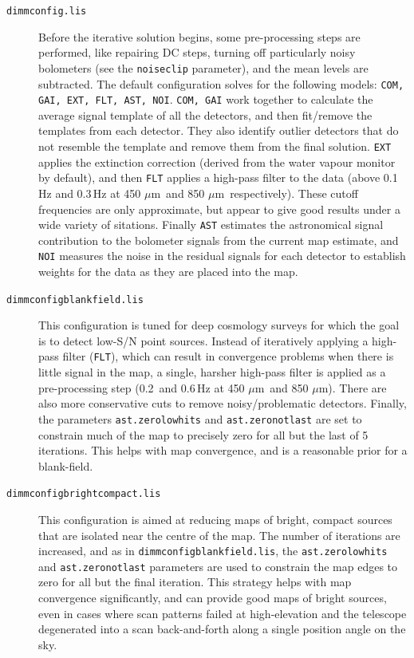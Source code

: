 \documentclass[twoside,11pt]{article}
\newcommand{\micron}{\mbox{\,${\mu}$m}}            %
\renewcommand{\_}{\texttt{\symbol{95}}}
\begin{document}
\begin{description}

\item[\texttt{dimmconfig.lis}] Before the iterative solution begins,
  some pre-processing steps are performed, like repairing DC steps,
  turning off particularly noisy bolometers (see the
  \texttt{noiseclip} parameter), and the mean levels are subtracted.
  The default configuration solves for the following models:
  \texttt{COM, GAI, EXT, FLT, AST, NOI}. \texttt{COM, GAI} work
  together to calculate the average signal template of all the
  detectors, and then fit/remove the templates from each
  detector. They also identify outlier detectors that do not resemble
  the template and remove them from the final solution. \texttt{EXT}
  applies the extinction correction (derived from the water vapour
  monitor by default), and then \texttt{FLT} applies a high-pass
  filter to the data (above 0.1\,Hz and 0.3\,Hz at 450\,\micron\ and
  850\,\micron\ respectively). These cutoff frequencies are only
  approximate, but appear to give good results under a wide variety of
  sitations. Finally \texttt{AST} estimates the astronomical signal
  contribution to the bolometer signals from the current map estimate,
  and \texttt{NOI} measures the noise in the residual signals for each
  detector to establish weights for the data as they are placed into
  the map.

\item[\texttt{dimmconfig\_blank\_field.lis}] This configuration is
  tuned for deep cosmology surveys for which the goal is to detect
  low-S/N point sources. Instead of iteratively applying a high-pass
  filter (\texttt{FLT}), which can result in convergence problems when
  there is little signal in the map, a single, harsher high-pass
  filter is applied as a pre-processing step (0.2\, and 0.6\,Hz at
  450\,\micron\ and 850\,\micron). There are also more conservative
  cuts to remove noisy/problematic detectors. Finally, the parameters
  \texttt{ast.zero\_lowhits} and \texttt{ast.zero\_notlast} are set to
  constrain much of the map to precisely zero for all but the last of
  5 iterations. This helps with map convergence, and is a reasonable
  prior for a blank-field.

\item[\texttt{dimmconfig\_bright\_compact.lis}] This configuration is
  aimed at reducing maps of bright, compact sources that are isolated
  near the centre of the map. The number of iterations are increased,
  and as in \texttt{dimmconfig\_blank\_field.lis}, the
  \texttt{ast.zero\_lowhits} and \texttt{ast.zero\_notlast} parameters
  are used to constrain the map edges to zero for all but the final
  iteration. This strategy helps with map convergence significantly,
  and can provide good maps of bright sources, even in cases where
  scan patterns failed at high-elevation and the telescope degenerated
  into a scan back-and-forth along a single position angle on the sky.


\end{description}
\end{document}
